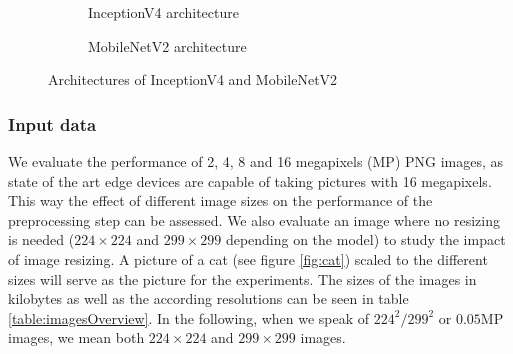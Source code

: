 \begin{figure}[!htb]
\centering
\begin{subfigure}[t]{0.47\textwidth}
   \resizebox{.99\linewidth}{!}{}
   \caption{InceptionV4 architecture \cite{InceptionV4}}
   \label{fig:inceptionv4Archi} 
\end{subfigure}%
\begin{subfigure}[t]{0.47\textwidth}
   \resizebox{.99\linewidth}{!}{}
   \caption{MobileNetV2 architecture \cite{DBLP:journals/corr/abs-1801-04381}}
   \label{fig:MobileNetArchi}
\end{subfigure}

\caption{Architectures of InceptionV4 and MobileNetV2}
\end{figure}

\subsubsection{Input data}
We evaluate the performance of 2, 4, 8 and 16  megapixels (MP) PNG images, as state of the art edge devices are capable of taking pictures with 16 megapixels. This way the effect of different image sizes on the performance of the preprocessing step can be assessed. We also evaluate an image where no resizing is needed ($224\times224$ and $299\times299$ depending on the model) to study the impact of image resizing. A picture of a cat (see figure \ref{fig:cat}) scaled to the different sizes will serve as the picture for the experiments.
The sizes of the images in kilobytes as well as the according resolutions can be seen in table \ref{table:imagesOverview}. In the following, when we speak of $224^2/299^2$ or $0.05$MP images, we mean both $224\times224$ and $299\times299$ images.

